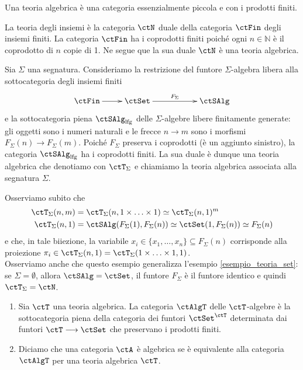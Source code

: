 \begin{definition}\label{def_teoria_alg}
Una teoria algebrica è una categoria essenzialmente piccola e con i prodotti finiti.
\end{definition} 

\begin{example}\label{esempio_teoria_set}
La teoria degli insiemi è la categoria $\ctN$ duale della categoria $\ctFin$ degli insiemi finiti. La categoria $\ctFin$ ha i coprodotti 
finiti poiché ogni $n \in \mathbb N$ è il coprodotto di $n$ copie di 1. Ne segue que la sua duale $\ctN$ è una teoria algebrica.
\end{example} 

\begin{example}\label{esempio_teoria_sigma}
Sia $\Sigma$ una segnatura. Consideriamo la restrizione del funtore $\Sigma$-algebra libera alla sottocategoria degli insiemi finiti
\[
  \xymatrix{\ctFin \ar[r] & \ctSet \ar[rr]^-{F_{\Sigma}} & & \ctSAlg} 
\]
e la sottocategoria piena $\ctSAlg_{\mathrm{lfg}}$ delle $\Sigma$-algebre libere finitamente generate: gli oggetti sono i numeri naturali e le frecce
$n \to m$ sono i morfismi $F_{\Sigma}(n) \to F_{\Sigma}(m)$. Poiché $F_{\Sigma}$ preserva i coprodotti (è un aggiunto sinistro), la 
categoria $\ctSAlg_{\mathrm{lfg}}$ ha i coprodotti finiti. La sua duale è dunque una teoria algebrica che denotiamo con $\ctT_{\Sigma}$ e
chiamiamo la teoria algebrica associata alla segnatura $\Sigma$.

Osserviamo subito che
\begin{align*}
	\ctT_{\Sigma}(n,m) & = \ctT_{\Sigma}(n,1 \times \ldots \times 1) \simeq \ctT_{\Sigma}(n,1)^m\\
	\ctT_{\Sigma}(n,1) & = \ctSAlg(F_{\Sigma}(1),F_{\Sigma}(n)) \simeq \ctSet(1,F_{\Sigma}(n)) \simeq F_{\Sigma}(n)
\end{align*}
e che, in tale biiezione, la variabile $x_i \in \{x_1,\ldots,x_n\} \subseteq F_{\Sigma}(n)$ corrisponde alla proiezione 
$\pi_i \in \ctT_{\Sigma}(n,1) = \ctT_{\Sigma}(1 \times \ldots \times 1,1)$. \\
Osserviamo anche che questo esempio generalizza l'esempio \ref{esempio_teoria_set}: se $\Sigma = \emptyset$, allora $\ctSAlg = \ctSet$,
il funtore $F_{\Sigma}$ è il funtore identico e quindi $\ctT_{\Sigma} = \ctN$.
\end{example} 

\begin{definition}\label{def_Talg}
\hfill
\begin{enumerate}
\item Sia $\ctT$ una teoria algebrica. La categoria $\ctAlgT$ delle $\ctT$-algebre è la sottocategoria piena della categoria dei funtori
$\ctSet^{\ctT}$ determinata dai funtori $\ctT \fun \ctSet$ che preservano i prodotti finiti.
\item Diciamo che una categoria $\ctA$ è algebrica se è equivalente alla categoria $\ctAlgT$ per una teoria algebrica $\ctT$.
\end{enumerate}
\end{definition}

